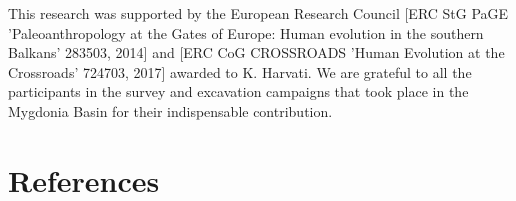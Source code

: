 \documentclass[review,times,authoryear]{elsarticle} %
\begin{document}
This research was supported by the European Research Council [ERC StG PaGE 'Paleoanthropology at the Gates of Europe: Human evolution in the southern Balkans' 283503, 2014] and [ERC CoG CROSSROADS 'Human Evolution at the Crossroads' 724703, 2017] awarded to K. Harvati. We are grateful to all the participants in the survey and excavation campaigns that took place in the Mygdonia Basin for their indispensable contribution. %
 
\section*{References}



\end{document}

